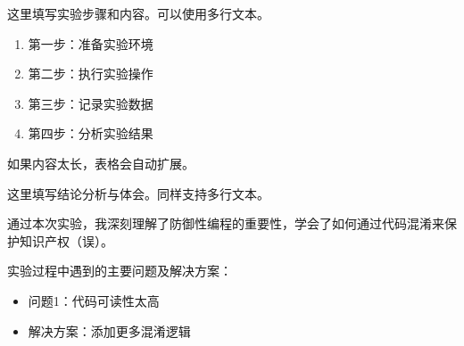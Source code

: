 \documentclass{sdu_exp_report}
\begin{document}
\DrawExperimentReport

\begin{procedure}
这里填写实验步骤和内容。可以使用多行文本。

\begin{enumerate}
    \item 第一步：准备实验环境
    \item 第二步：执行实验操作
    \item 第三步：记录实验数据
    \item 第四步：分析实验结果
\end{enumerate}

如果内容太长，表格会自动扩展。
\end{procedure}

\begin{reflection}
这里填写结论分析与体会。同样支持多行文本。

通过本次实验，我深刻理解了防御性编程的重要性，学会了如何通过代码混淆来保护知识产权（误）。

实验过程中遇到的主要问题及解决方案：
\begin{itemize}
    \item 问题1：代码可读性太高
    \item 解决方案：添加更多混淆逻辑
\end{itemize}
\end{reflection}
\end{document}
